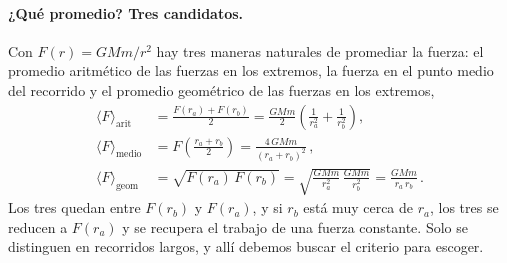 \paragraph{¿Qué promedio? Tres candidatos.}
Con $F(r) = GMm/r^{2}$ hay tres maneras naturales de promediar la fuerza: el
promedio aritmético de las fuerzas en los extremos, la fuerza en el punto
medio del recorrido y el promedio geométrico de las fuerzas en los extremos,
\begin{align}
  \langle F\rangle_{\text{arit}}
  &= \frac{F(r_{a}) + F(r_{b})}{2}
   = \frac{GMm}{2}\left(\frac{1}{r_{a}^{2}} + \frac{1}{r_{b}^{2}}\right) ,
  \label{eq:promedio_aritmetico}\\
  \langle F\rangle_{\text{medio}}
  &= F\!\left(\frac{r_{a} + r_{b}}{2}\right)
   = \frac{4\,GMm}{(r_{a} + r_{b})^{2}} \,,
  \label{eq:promedio_punto_medio}\\
  \langle F\rangle_{\text{geom}}
  &= \sqrt{F(r_{a})\,F(r_{b})}
   = \sqrt{\frac{GMm}{r_{a}^{2}}\,\frac{GMm}{r_{b}^{2}}}
   = \frac{GMm}{r_{a}\,r_{b}} \,.
  \label{eq:promedio_geometrico}
\end{align}
Los tres quedan entre $F(r_{b})$ y $F(r_{a})$, y si $r_{b}$ está muy cerca de
$r_{a}$, los tres se reducen a $F(r_{a})$ y se recupera el trabajo de una
fuerza constante. Solo se distinguen en recorridos largos, y allí debemos
buscar el criterio para escoger.

